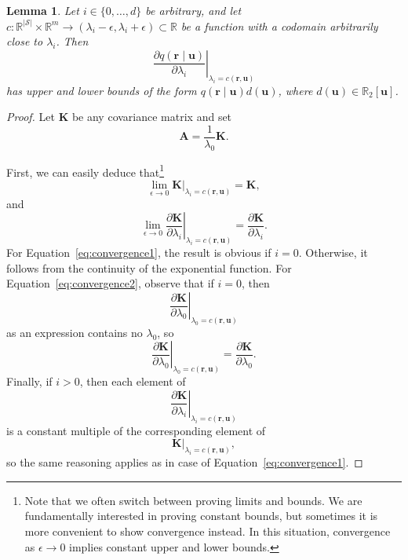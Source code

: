 \documentclass{mpaper}
\newtheorem{lemma}[theorem]{Lemma}
\begin{document}
\begin{lemma} \label{lemma:bound1}
  Let $i \in \{ 0, \dots, d \}$ be arbitrary, and let $c :
  \mathbb{R}^{|\mathcal{S}|} \times \mathbb{R}^m \to (\lambda_i - \epsilon,
  \lambda_i + \epsilon) \subset \mathbb{R}$ be a function with a codomain
  arbitrarily close to $\lambda_i$. Then
  \[
    \left. \frac{\partial q(\mathbf{r} \mid \mathbf{u})}{\partial \lambda_i}
    \right|_{\lambda_i = c(\mathbf{r}, \mathbf{u})}
  \]
  has upper and lower bounds of the form $q(\mathbf{r} \mid
  \mathbf{u})d(\mathbf{u})$, where $d(\mathbf{u}) \in \mathbb{R}_2[\mathbf{u}]$.
\end{lemma}
\begin{proof}
  Let $\mathbf{K}$ be any covariance matrix and set
  \[
    \mathbf{A} = \frac{1}{\lambda_0} \mathbf{K}.
  \]

  First, we can easily deduce that\footnote{Note that we often switch between
    proving limits and bounds. We are fundamentally interested in proving
    constant bounds, but sometimes it is more convenient to show convergence
    instead. In this situation, convergence as $\epsilon \to 0$ implies constant
    upper and lower bounds.}
  \begin{equation} \label{eq:convergence1}
    \lim_{\epsilon \to 0} \mathbf{K}|_{\lambda_i = c(\mathbf{r}, \mathbf{u})} = \mathbf{K},
  \end{equation}
  and
  \begin{equation} \label{eq:convergence2}
    \lim_{\epsilon \to 0} \left. \frac{\partial \mathbf{K}}{\partial \lambda_i} \right|_{\lambda_i = c(\mathbf{r}, \mathbf{u})} = \frac{\partial \mathbf{K}}{\partial \lambda_i}.
  \end{equation}
  For Equation~\eqref{eq:convergence1}, the result is obvious if $i = 0$.
  Otherwise, it follows from the continuity of the exponential function. For
  Equation~\eqref{eq:convergence2}, observe that if $i=0$, then
  \[
    \left. \frac{\partial \mathbf{K}}{\partial \lambda_0} \right|_{\lambda_0 =
      c(\mathbf{r}, \mathbf{u})}
  \]
  as an expression contains no $\lambda_0$, so
  \[
    \left. \frac{\partial \mathbf{K}}{\partial \lambda_0} \right|_{\lambda_0 =
      c(\mathbf{r}, \mathbf{u})} = \frac{\partial \mathbf{K}}{\partial
      \lambda_0}.
  \]
  Finally, if $i>0$, then each element of 
  \[
    \left. \frac{\partial \mathbf{K}}{\partial \lambda_i}
    \right|_{\lambda_i = c(\mathbf{r}, \mathbf{u})}
  \]
  is a constant multiple of the corresponding element of
  \[
    \mathbf{K}|_{\lambda_i = c(\mathbf{r}, \mathbf{u})},
  \]
  so the same reasoning applies as in case of Equation~\eqref{eq:convergence1}.


\end{proof}
\end{document}
